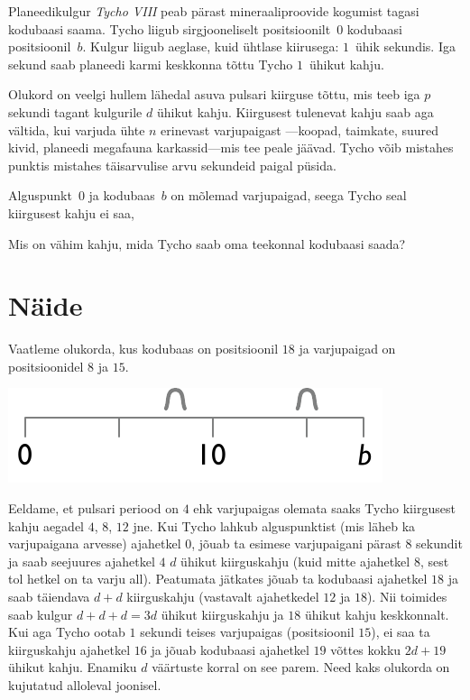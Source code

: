 

\noindent
Planeedikulgur \emph{Tycho VIII} peab pärast mineraaliproovide kogumist tagasi kodubaasi saama.
Tycho liigub sirgjooneliselt positsioonilt~$0$ kodubaasi positsioonil~$b$.
Kulgur liigub aeglase, kuid ühtlase kiirusega: $1$~ühik sekundis.
Iga sekund saab planeedi karmi keskkonna tõttu Tycho $1$~ühikut kahju. 

Olukord on veelgi hullem lähedal asuva pulsari kiirguse tõttu, mis teeb iga $p$ sekundi tagant kulgurile
$d$ ühikut kahju.
Kiirgusest tulenevat kahju saab aga vältida, kui varjuda ühte $n$ erinevast varjupaigast ---koopad, taimkate, suured kivid, planeedi megafauna karkassid---mis tee peale jäävad.
Tycho võib mistahes punktis mistahes täisarvulise arvu sekundeid paigal püsida.

Alguspunkt~$0$ ja kodubaas~$b$ on mõlemad varjupaigad, seega Tycho seal kiirgusest kahju ei saa,

\medskip
Mis on vähim kahju, mida Tycho saab oma teekonnal kodubaasi saada?

\section*{Näide}

Vaatleme olukorda, kus kodubaas on positsioonil $18$ ja varjupaigad on positsioonidel $8$ ja $15$.

\includegraphics[width=.3\textwidth]{img/samplesetup}

Eeldame, et pulsari periood on $4$ ehk varjupaigas olemata saaks Tycho kiirgusest kahju
aegadel $4$, $8$, $12$ jne.
Kui Tycho lahkub alguspunktist (mis läheb ka varjupaigana arvesse) ajahetkel $0$, jõuab ta esimese
varjupaigani pärast $8$ sekundit ja saab seejuures ajahetkel $4$ $d$ ühikut kiirguskahju
(kuid mitte ajahetkel $8$, sest tol hetkel on ta varju all).
Peatumata jätkates jõuab ta kodubaasi ajahetkel $18$ ja saab täiendava $d+d$ kiirguskahju
(vastavalt ajahetkedel $12$ ja $18$).
Nii toimides saab kulgur $d+d+d=3d$ ühikut kiirguskahju ja $18$ ühikut kahju keskkonnalt.
Kui aga Tycho ootab $1$ sekundi teises varjupaigas (positsioonil $15$), ei saa ta kiirguskahju
ajahetkel $16$ ja jõuab kodubaasi ajahetkel $19$ võttes kokku $2d + 19$ ühikut kahju.
Enamiku $d$ väärtuste korral on see parem.
Need kaks olukorda on kujutatud alloleval joonisel.

